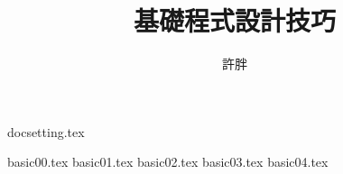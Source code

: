 \documentclass[12pt,a4paper,oneside]{report}
\begin{document}
\begin{CJK}{UTF8}{bkai}

{docsetting.tex}

\title{基礎程式設計技巧}
\author{許胖}

\maketitle

\begin{multicols}{2}
\tableofcontents
\end{multicols}

{basic00.tex}
{basic01.tex}
{basic02.tex}
{basic03.tex}
{basic04.tex}

\printindex

\clearpage
\end{CJK}
\end{document}
